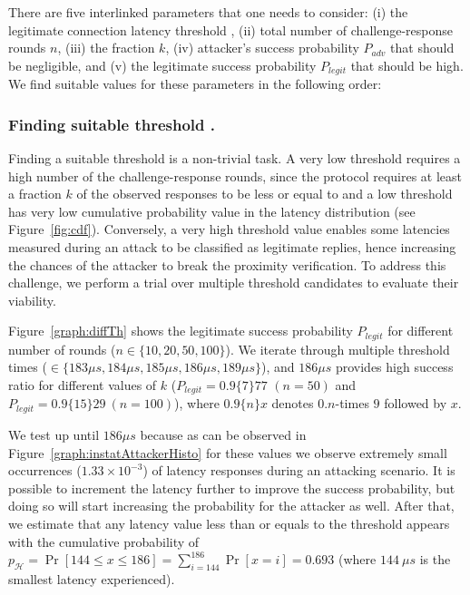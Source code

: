 There are five interlinked parameters that one needs to consider: (i) the legitimate connection latency threshold \connect, (ii) total number of challenge-response rounds $n$, (iii) the fraction $k$, (iv) attacker's success probability $P_{adv}$ that should be negligible, and (v) the legitimate success probability $P_{legit}$ that should be high. We find suitable values for these parameters in the following order:



\newcommand{\mainResultCaption}{\textbf{Distinguishing relay attack.} The attacker's success probability $P_{adv}$ and the legitimate success probability $P_{legit}$ in proximity verification for different number of rounds ($n$) given a fixed $k=0.4$.}


\subsubsection{Finding suitable threshold \connect.} Finding a suitable threshold \connect is a non-trivial task. A very low threshold requires a high number of the challenge-response rounds, since the protocol requires at least a fraction $k$ of the observed responses to be less or equal to \connect and a low threshold has very low cumulative probability value in the latency distribution (see Figure~\ref{fig:cdf}). Conversely, a very high threshold value enables some latencies measured during an attack to be classified as legitimate replies, hence increasing the chances of the attacker to break the proximity verification. To address this challenge, we perform a trial over multiple threshold candidates to evaluate their viability.


Figure~\ref{graph:diffTh} shows the legitimate success probability $P_{legit}$ for different number of rounds ($n\in\{10,20,50,100\}$). We iterate through multiple threshold times (\connect$\in\{183\mu s,184\mu s,185\mu s, 186\mu s, 189\mu s\}$), and $186\mu s$ provides high success ratio for different values of $k$ ($P_{legit}=0.9\{7\}77$ $(n=50)$ and $P_{legit}=0.9\{15\}29\ (n=100)$), where $0.9\{n\}x$ denotes $0.n$-times $9$ followed by $x$.

We test \connect up until $186 \mu s$ because as can be observed in Figure~\ref{graph:instatAttackerHisto} for these values we observe extremely small occurrences ($1.33\times10^{-3}$) of latency responses during an attacking scenario. It is possible to increment the latency further to improve the success probability, but doing so will start increasing the probability for the attacker as well. 
%
After that, we estimate that any latency value less than or equals to the threshold \connect appears with the cumulative probability of $p_{\mathcal{H}} = \Pr[144\leq x \leq 186] = \sum_{i=144}^{186}\Pr[x=i] = 0.693$ (where $144\ \mu s$ is the smallest latency experienced).

